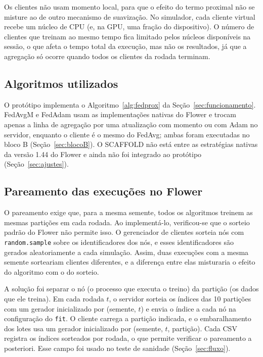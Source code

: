 Os clientes não usam momento local, para que o efeito do termo proximal não se misture ao de outro mecanismo de suavização. No simulador, cada cliente virtual recebe um núcleo de CPU (e, na GPU, uma fração do dispositivo). O número de clientes que treinam ao mesmo tempo fica limitado pelos núcleos disponíveis na sessão, o que afeta o tempo total da execução, mas não os resultados, já que a agregação só ocorre quando todos os clientes da rodada terminam.

\subsection{Algoritmos utilizados}

O protótipo implementa o Algoritmo~\ref{alg:fedprox} da Seção~\ref{sec:funcionamento}. FedAvgM e FedAdam usam as implementações nativas do Flower e trocam apenas a linha de agregação por uma atualização com momento ou com Adam no servidor, enquanto o cliente é o mesmo do FedAvg; ambas foram executadas no bloco B (Seção~\ref{sec:blocoB}). O SCAFFOLD não está entre as estratégias nativas da versão 1.44 do Flower e ainda não foi integrado ao protótipo (Seção~\ref{sec:ajustes}).

\subsection{Pareamento das execuções no Flower}
\label{sec:pareamento}

O pareamento exige que, para a mesma semente, todos os algoritmos treinem as mesmas partições em cada rodada. Ao implementá-lo, verificou-se que o sorteio padrão do Flower não permite isso. O gerenciador de clientes sorteia nós com \texttt{random.sample} sobre os identificadores dos nós, e esses identificadores são gerados aleatoriamente a cada simulação. Assim, duas execuções com a mesma semente sorteariam clientes diferentes, e a diferença entre elas misturaria o efeito do algoritmo com o do sorteio.

A solução foi separar o nó (o processo que executa o treino) da partição (os dados que ele treina). Em cada rodada $t$, o servidor sorteia os índices das 10 partições com um gerador inicializado por (semente, $t$) e envia o índice a cada nó na configuração do \texttt{fit}. O cliente carrega a partição indicada, e o embaralhamento dos lotes usa um gerador inicializado por (semente, $t$, partição). Cada CSV registra os índices sorteados por rodada, o que permite verificar o pareamento a posteriori. Esse campo foi usado no teste de sanidade (Seção~\ref{sec:fluxo}).

